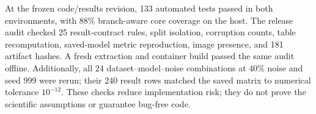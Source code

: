 At the frozen code/results revision, 133 automated tests passed in both
environments, with 88\% branch-aware core coverage on the host. The release
audit checked 25 result-contract rules, split isolation, corruption counts,
table recomputation, saved-model metric reproduction, image presence, and
181 artifact hashes. A fresh extraction and container build passed the same
audit offline. Additionally, all 24 dataset--model--noise combinations at
40\% noise and seed 999 were rerun; their 240 result rows matched the saved
matrix to numerical tolerance $10^{-12}$. These checks reduce implementation
risk; they do not prove the scientific assumptions or guarantee bug-free code.
